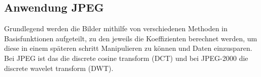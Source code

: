 \subsection{Anwendung JPEG
\label{jpeg:subsection:anwendung}}
Grundlegend werden die Bilder mithilfe von verschiedenen Methoden in Basisfunktionen aufgeteilt, zu den jeweils die Koeffizienten berechnet werden, um diese in einem späteren schritt Manipulieren zu können und Daten einzusparen. 
Bei JPEG ist das die discrete cosine transform (DCT) und bei JPEG-2000 die discrete wavelet transform (DWT).
